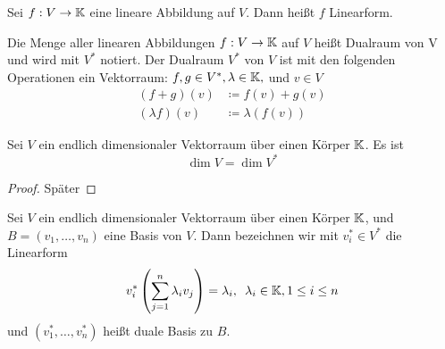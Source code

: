 \begin{definition}
    Sei $f: V\to \mathbb{K}$ eine lineare Abbildung auf $V$. Dann heißt $f$ Linearform.
\end{definition}
\begin{definition}
    Die Menge aller linearen Abbildungen $f:V\to\mathbb{K}$ auf $V$ heißt Dualraum von V
    und wird mit $V^*$ notiert. Der Dualraum $V^*$ von $V$ ist mit den folgenden
    Operationen ein Vektorraum: $f,g \in V^*, \lambda \in \mathbb{K},$ und $v\in V$
    \begin{align*}
        (f+g)(v) &\coloneqq f(v) + g(v)\\
        (\lambda f)(v) &\coloneqq \lambda(f(v))
    \end{align*}
\end{definition}
\begin{theorem}
    Sei $V$ ein endlich dimensionaler Vektorraum über einen Körper $\mathbb{K}$. Es ist
    \[
        \dim V = \dim V^*
    \]
\end{theorem}
\begin{proof}
    Später
\end{proof}
\begin{definition}
    Sei $V$ ein endlich dimensionaler Vektorraum über einen Körper $\mathbb{K}$, und $B
    = (v_1, \dots, v_n)$ eine Basis von $V$. Dann bezeichnen wir mit $v_i^* \in
    V^*$ die Linearform \[
        v_i^*\left(\displaystyle\sum_{j=1}^n \lambda_i v_j\right) = \lambda_i, \hspace{.5em}
         \lambda_i \in \mathbb{K}, 1\leq i \leq n\]
    und $(v_1^*, \dots, v_n^*)$ heißt duale Basis zu $B$.
\end{definition}

